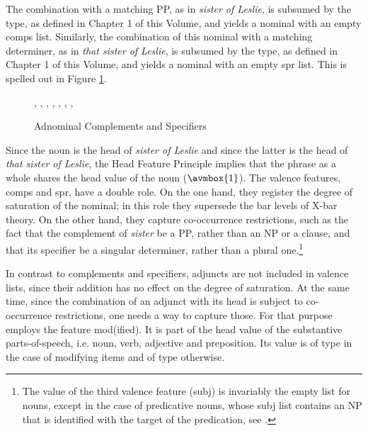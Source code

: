 \documentclass[output=paper]{langsci/langscibook}
\begin{document}
\noindent
The combination with a matching PP, as in \emph{sister of Leslie},   
is subsumed by the  type, as defined in 
Chapter 1 of this Volume, 
and yields a nominal with an empty {\sc comps} list.  
Similarly, the combination of this nominal with a matching determiner, as in \emph{that sister of Leslie},    
is subsumed by the  type, as defined in Chapter 1 of this Volume, 
and yields a nominal with an empty {\sc spr} list. This is spelled out in Figure \ref{les}. 

\begin{figure}
\begin{center}
\footnotesize
\tree
{,
  {,
    {}},
  {,
    {,
      {}},
    {, 
      {}}}}
\caption{\label{les} Adnominal Complements and Specifiers  }
\normalsize
\end{center}
\end{figure}

Since the noun is the head of \emph{sister of Leslie} and since the latter is 
the head of \emph{that sister of Leslie}, the Head Feature Principle implies 
that the phrase as a whole shares the {\sc head} value of the noun ($\avmbox{1}$). 
The valence features, {\sc comps} and {\sc spr}, have a double role. 
On the one hand, they register the degree of saturation of the nominal; 
in this role they supersede the bar levels of X-bar theory. 
On the other hand, they capture co-occurrence restrictions, 
such as the fact that the complement of \emph{sister} be a PP, rather than an NP or a clause, 
and that its specifier be a singular determiner, rather than a plural one.\footnote{The 
value of the third valence feature ({\sc subj}) is invariably the empty list for nouns, 
except in the case of predicative nouns, whose {\sc subj} list contains an NP 
that is identified with the target of the predication, see \citet[409]{GS00}.}

In contrast to complements and specifiers, adjuncts are not included in valence lists, 
since their addition has no effect on the degree of saturation. At the same time, 
since the combination of an adjunct with its head is subject to 
co-occurrence restrictions, one needs a way to capture those. 
For that purpose \citet[55--57]{ps2} employs the feature {\sc mod(ified)}. 
It is part of the {\sc head} value of the substantive parts-of-speech, 
i.e. noun, verb, adjective and preposition. Its value is of type  
in the case of modifying items and of type  otherwise.
\end{document}
